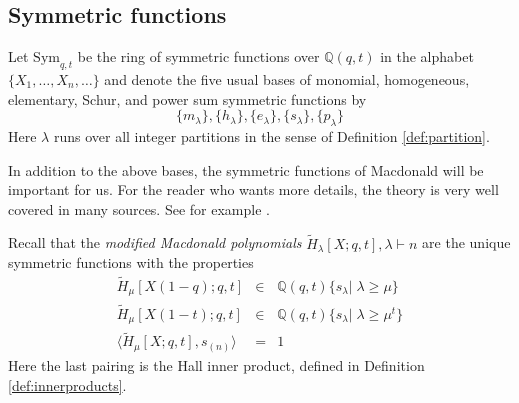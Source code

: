 \documentclass{amsart}
\numberwithin{equation}{section}
\theoremstyle{definition}
\def\Sym{{\mathrm{Sym}}}
\newcommand{\tH}{\widetilde{H}}
\newcommand{\Z}{{\mathbb Z}}
\newcommand{\Q}{{\mathbb Q}}
\begin{document}
\subsection{Symmetric functions}\label{subsec:Sym}
Let $\Sym_{q,t}$ be the ring of symmetric functions over $\Q(q,t)$ in the alphabet $\{X_1,\ldots,X_n,\ldots\}$ and denote the five usual bases of monomial, homogeneous, elementary, Schur, and power sum symmetric functions by
$$\{m_\lambda\},\{h_\lambda\},\{e_\lambda\},\{s_\lambda\},\{p_\lambda\}$$
Here $\lambda$ runs over all integer partitions in the sense of Definition \ref{def:partition}. %

In addition to the above bases, the symmetric functions of Macdonald will be important for us. For the reader who wants more details, the theory is very well covered in many sources. See for example \cite[Section 3]{HaimanCDM}.

Recall that the {\em modified Macdonald polynomials} $\tH_\lambda[X;q,t], \lambda\vdash n$ are the unique symmetric functions with the properties
\begin{eqnarray}
\tH_\mu[X(1-q);q,t]&\in&\Q(q,t)\{s_\lambda|\;\lambda\geq \mu\}\\
\tH_\mu[X(1-t);q,t]&\in&\Q(q,t)\{s_\lambda|\;\lambda\geq \mu^t\}\\
\langle \tH_\mu[X;q,t],s_{(n)}\rangle&=&1
\end{eqnarray}
Here the last pairing is the Hall inner product, defined in Definition \ref{def:innerproducts}.
\end{document}
